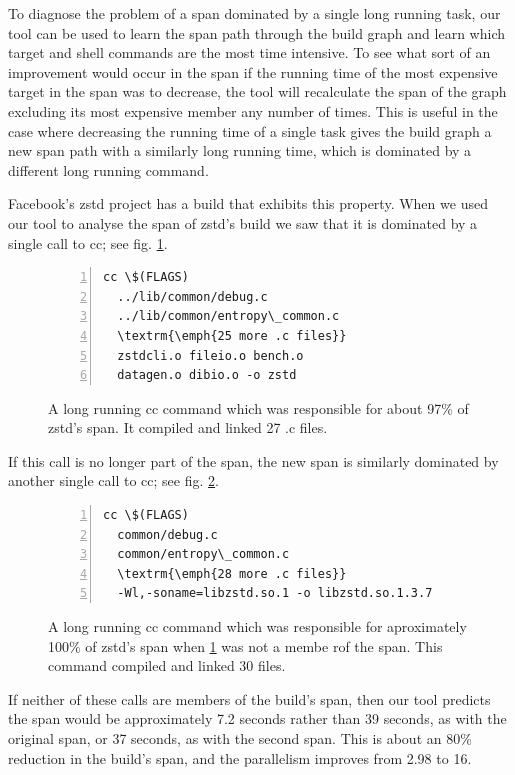 \documentclass[sigconf,10pt,review,authorversion]{acmart}\settopmatter{printfolios=true,printccs=false,printacmref=false}
\begin{document}
To diagnose the problem of a span dominated by a single long running task, our tool can be used
to learn the span path through the build graph and learn which target and shell commands
are the most time intensive.  To see what sort of an improvement would occur in the span if the
running time of the most expensive target in the span was to decrease, the tool will recalculate
the span of the graph excluding its most expensive member any number of times.  This is useful
in the case where decreasing the running time of a single task gives the build graph a new span
path with a similarly long running time, which is dominated by a different long running command.

Facebook's zstd project \cite{zstd1.3.7} has a build that exhibits this property.  When we used our tool to analyse
the span of zstd's build we saw that it is dominated by a single call to cc; see fig. \ref{code:cc1}.

\begin{figure}[H]
\begin{Verbatim}[commandchars=\\\{\},codes={\catcode`$=3\catcode`^=7\catcode`_=8},fontsize=\small,numbers=left,xleftmargin=5mm]
  cc \$(FLAGS)
  ../lib/common/debug.c
  ../lib/common/entropy\_common.c
  \textrm{\emph{25 more .c files}}
  zstdcli.o fileio.o bench.o
  datagen.o dibio.o -o zstd
\end{Verbatim}
\caption{A long running cc command which was responsible for about 97\% of zstd's span.  It compiled and linked 27 .c files.}
\label{code:cc1}
\end{figure}

If this call is no longer part of the span, the new span is similarly dominated by another single call to cc;
see fig. \ref{code:cc2}.
\begin{figure}[H]
\begin{Verbatim}[commandchars=\\\{\},codes={\catcode`$=3\catcode`^=7\catcode`_=8},fontsize=\small,numbers=left,xleftmargin=5mm]
  cc \$(FLAGS)
  common/debug.c
  common/entropy\_common.c
  \textrm{\emph{28 more .c files}}
  -Wl,-soname=libzstd.so.1 -o libzstd.so.1.3.7
\end{Verbatim}
\caption{A long running cc command which was responsible for aproximately 100\% of zstd's span when \ref{code:cc1} was not a membe rof the span.
This command compiled and linked 30 files.}
\label{code:cc2}
\end{figure}

If neither of these calls are members of the build's span, then our tool predicts the span would be
approximately 7.2 seconds rather than 39 seconds, as with the original span, or 37 seconds, as with the second span.
This is about an 80\% reduction in the build's span, and the parallelism improves from 2.98 to 16.
\end{document}
